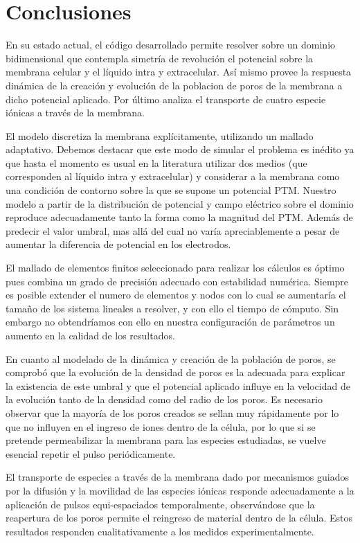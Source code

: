 \chapter{Conclusiones}


En su estado actual, el código desarrollado permite resolver sobre un dominio bidimensional que contempla simetría de revolución el potencial sobre la membrana celular y el líquido intra y extracelular. Así mismo provee la respuesta dinámica de la creación y evolución de la poblacion de poros de la membrana a dicho potencial aplicado. Por último analiza el transporte de cuatro especie iónicas a través de la membrana.

El modelo discretiza la membrana explícitamente, utilizando un mallado adaptativo. Debemos destacar que este modo de simular el problema es inédito ya que hasta el momento es usual en la literatura utilizar dos medios (que corresponden al líquido intra y extracelular) y considerar a la membrana como una condición de contorno sobre la que se supone un potencial PTM. Nuestro modelo a partir de la distribución de potencial y campo eléctrico sobre el dominio reproduce adecuadamente tanto la forma como la magnitud del PTM. Además de predecir el valor umbral, mas allá del cual no varía apreciablemente a pesar de aumentar la diferencia de potencial en los electrodos. 

El mallado de elementos finitos seleccionado para realizar los cálculos es óptimo pues combina un grado de precisión adecuado con estabilidad numérica. Siempre es posible extender el numero de elementos y nodos con lo cual se aumentaría el tamaño de los sistema lineales a resolver, y con ello el tiempo de cómputo. Sin embargo no obtendríamos con ello en nuestra configuración de parámetros un aumento en la calidad de los resultados.

En cuanto al modelado de la dinámica y creación de la población de poros, se comprobó que la evolución de la densidad de poros es la adecuada para explicar la existencia de este umbral y que el potencial aplicado influye en la velocidad de la evolución tanto de la densidad como del radio de los poros. 
Es necesario observar que la mayoría de los poros creados se sellan muy rápidamente por lo que no influyen en el ingreso de iones dentro de la célula, por lo que si se pretende permeabilizar la membrana para las especies estudiadas, se vuelve esencial repetir el pulso periódicamente. 

El transporte de especies a través de la membrana dado por mecanismos guiados por la difusión y la movilidad de las especies iónicas responde adecuadamente a la aplicación de pulsos equi-espaciados temporalmente, observándose que la reapertura de los poros permite el reingreso de material dentro de la célula. Estos resultados responden cualitativamente a los medidos experimentalmente.





